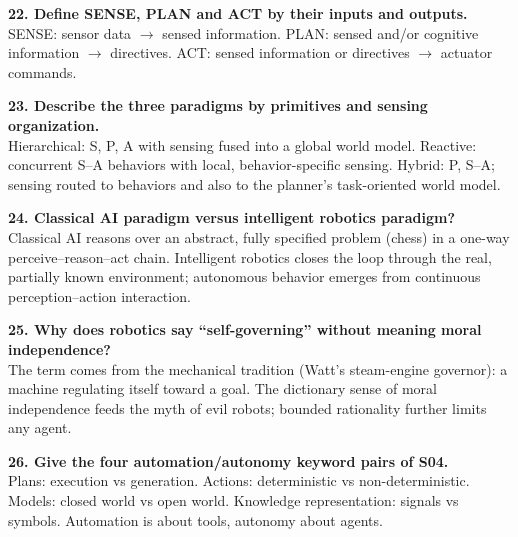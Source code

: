 \begin{samepage}\textbf{22. Define SENSE, PLAN and ACT by their inputs and outputs.}\\
SENSE: sensor data $\rightarrow$ sensed information. PLAN: sensed and/or cognitive information $\rightarrow$ directives. ACT: sensed information or directives $\rightarrow$ actuator commands.\par\end{samepage}

\begin{samepage}\textbf{23. Describe the three paradigms by primitives and sensing organization.}\\
Hierarchical: S, P, A with sensing fused into a global world model. Reactive: concurrent S--A behaviors with local, behavior-specific sensing. Hybrid: P, S--A; sensing routed to behaviors and also to the planner's task-oriented world model.\par\end{samepage}

\begin{samepage}\textbf{24. Classical AI paradigm versus intelligent robotics paradigm?}\\
Classical AI reasons over an abstract, fully specified problem (chess) in a one-way perceive--reason--act chain. Intelligent robotics closes the loop through the real, partially known environment; autonomous behavior emerges from continuous perception--action interaction.\par\end{samepage}

\begin{samepage}\textbf{25. Why does robotics say ``self-governing'' without meaning moral independence?}\\
The term comes from the mechanical tradition (Watt's steam-engine governor): a machine regulating itself toward a goal. The dictionary sense of moral independence feeds the myth of evil robots; bounded rationality further limits any agent.\par\end{samepage}

\begin{samepage}\textbf{26. Give the four automation/autonomy keyword pairs of S04.}\\
Plans: execution vs generation. Actions: deterministic vs non-deterministic. Models: closed world vs open world. Knowledge representation: signals vs symbols. Automation is about tools, autonomy about agents.\par\end{samepage}

